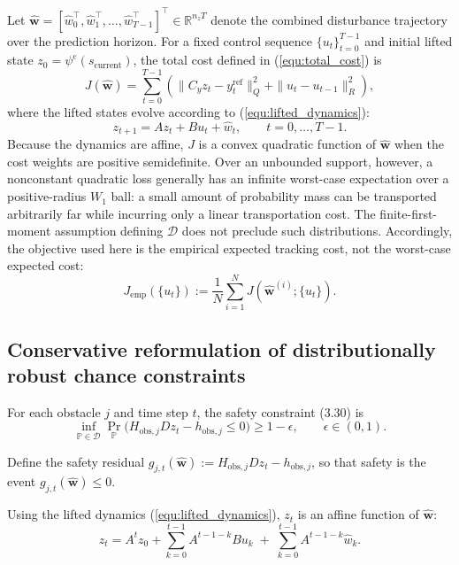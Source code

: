 \documentclass[pdflatex,sn-mathphys,Numbered]{sn-jnl}
\numberwithin{equation}{section}
\begin{document}
Let $\hat{\mathbf{w}} = [\hat{w}_0^\top,\hat{w}_1^\top,\dots,\hat{w}_{T-1}^\top]^\top \in \mathbb{R}^{n_z T}$ denote the combined disturbance trajectory over the prediction horizon. For a fixed control sequence $\{u_t\}_{t=0}^{T-1}$ and initial lifted state $z_0 = \psi^e(s_{\text{current}})$, the total cost defined in (\ref{equ:total_cost}) is
\begin{equation}
J(\hat{\mathbf{w}}) = \sum_{t=0}^{T-1}\left( \|C_y z_t - y_t^{\text{ref}}\|_Q^2 + \|u_t - u_{t-1}\|_R^2 \right),
\end{equation}
where the lifted states evolve according to (\ref{equ:lifted_dynamics}):
\begin{equation}
z_{t+1} = A z_t + B u_t + \hat{w}_t, \qquad t=0,\dots,T-1.
\end{equation}
Because the dynamics are affine, $J$ is a convex quadratic function of $\hat{\mathbf{w}}$ when the cost weights are positive semidefinite. Over an unbounded support, however, a nonconstant quadratic loss generally has an infinite worst-case expectation over a positive-radius $W_1$ ball: a small amount of probability mass can be transported arbitrarily far while incurring only a linear transportation cost. The finite-first-moment assumption defining $\mathcal{D}$ does not preclude such distributions. Accordingly, the objective used here is the empirical expected tracking cost, not the worst-case expected cost:
\begin{equation}
J_{\mathrm{emp}}(\{u_t\}) := \frac{1}{N}\sum_{i=1}^{N}J(\hat{\mathbf{w}}^{(i)};\{u_t\}).
\label{eq:empirical_objective}
\end{equation}

\subsection{Conservative reformulation of distributionally robust chance constraints}

For each obstacle $j$ and time step $t$, the safety constraint (3.30) is
\begin{equation}
\inf_{\mathbb{P}\in\mathcal{D}} \Pr_{\mathbb{P}}\bigl( H_{\text{obs},j}D z_t - h_{\text{obs},j} \le 0 \bigr) \ge 1-\epsilon,
\qquad \epsilon\in(0,1). \label{eq:safety}
\end{equation}

Define the safety residual $g_{j,t}(\hat{\mathbf{w}}) := H_{\text{obs},j}D z_t-h_{\text{obs},j}$, so that safety is the event $g_{j,t}(\hat{\mathbf{w}})\le0$.

Using the lifted dynamics (\ref{equ:lifted_dynamics}), $z_t$ is an affine function of $\hat{\mathbf{w}}$:
\begin{equation}
z_t = A^t z_0 + \sum_{k=0}^{t-1} A^{t-1-k} B u_k \;+\; \sum_{k=0}^{t-1} A^{t-1-k} \hat{w}_k.
\end{equation}
\end{document}
